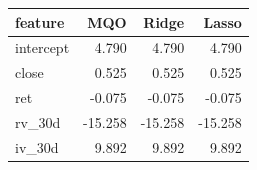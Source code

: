 \begin{tabular}{lrrr}
\toprule
feature & MQO & Ridge & Lasso \\
\midrule
intercept & 4.790 & 4.790 & 4.790 \\
close & 0.525 & 0.525 & 0.525 \\
ret & -0.075 & -0.075 & -0.075 \\
rv_30d & -15.258 & -15.258 & -15.258 \\
iv_30d & 9.892 & 9.892 & 9.892 \\
\bottomrule
\end{tabular}
